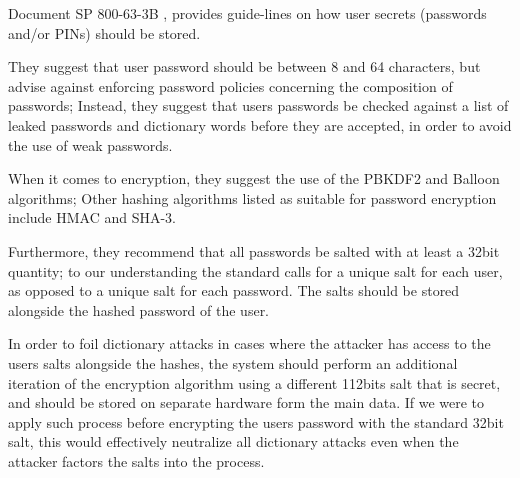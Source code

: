 Document SP 800-63-3B \cite{NIST_2017}, provides guide-lines on how user secrets (passwords and/or PINs) should be stored.

They suggest that user password should be between 8 and 64 characters, but advise against enforcing password policies concerning the composition of passwords; Instead, they suggest that users passwords be checked against a list of leaked passwords and dictionary words before they are accepted, in order to avoid the use of weak passwords.

When it comes to encryption, they suggest the use of the PBKDF2 and Balloon algorithms; Other hashing algorithms listed as suitable for password encryption include HMAC and SHA-3.

Furthermore, they recommend that all passwords be salted with at least a 32bit quantity; to our understanding the standard calls for a unique salt for each user, as opposed to a unique salt for each password. The salts should be stored alongside the hashed password of the user.

In order to foil dictionary attacks in cases where the attacker has access to the users salts alongside the hashes, the system should perform an additional iteration of the encryption algorithm using a different 112bits salt that is secret, and should be stored on separate hardware form the main data.\newline
If we were to apply such process before encrypting the users password with the standard 32bit salt, this would effectively neutralize all dictionary attacks even when the attacker factors the salts into the process.

 
  




